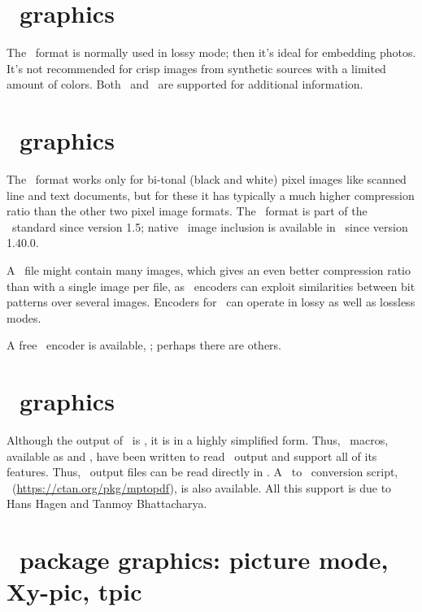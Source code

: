 \documentclass{pdftexmanual}
\begin{document}
\section{\JPEG\ graphics}

The \JPEG\ format is normally used in lossy mode; then it's ideal for
embedding photos.  It's not recommended for crisp images from synthetic
sources with a limited amount of colors.  Both \JFIF\ and \EXIF\ are
supported for additional information.

\section{\JBIGTWO\ graphics}

The \JBIGTWO\ format works only for bi-tonal (black and white) pixel
images like scanned line and text documents, but for these it has
typically a much higher compression ratio than the other two pixel image
formats. The \JBIGTWO\ format is part of the \PDF\ standard since
version 1.5; native \JBIGTWO\ image inclusion is available in \PDFTEX\
since version 1.40.0.

A \JBIGTWO\ file might contain many images, which gives an even better
compression ratio than with a single image per file, as \JBIGTWO\
encoders can exploit similarities between bit patterns over several
images. Encoders for \JBIGTWO\ can operate in lossy as well as lossless
modes.

A free \JBIGTWO\ encoder is available, ; perhaps there
are others.

\section{\METAPOST\ graphics}

Although the output of \METAPOST\ is \POSTSCRIPT, it is in a highly
simplified form. Thus, \TEX\ macros, available as 
and \type{supp-pdf.mkii}, have been written to read \METAPOST\ output
and support all of its features. Thus, \METAPOST\ output files can be
read directly in \TEX. A \METAPOST\ to \PDF\ conversion script,
\MPTOPDF\ (\url{https://ctan.org/pkg/mptopdf}), is also available. All
this support is due to Hans Hagen and Tanmoy Bhattacharya.

\section{\TEX\ package graphics: picture mode, Xy-pic, tpic}
\end{document}
